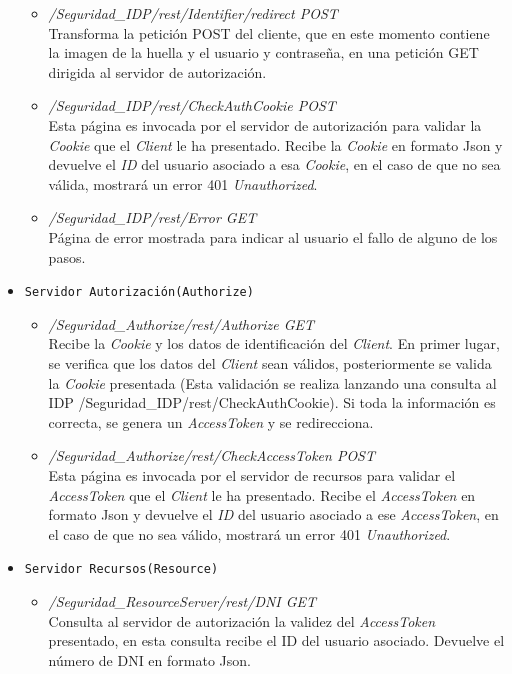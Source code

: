 \documentclass[a4,12pt,onecolum]{article}
\begin{document}
\begin{itemize}
\begin{itemize}
		\item \emph{/Seguridad\_IDP/rest/Identifier/redirect	POST} \\
		Transforma la petición POST del cliente, que en este momento contiene la imagen de la huella y el 				usuario y contraseña, en una petición GET dirigida al servidor de autorización.

		\item \emph{/Seguridad\_IDP/rest/CheckAuthCookie	POST} \\
		Esta página es invocada por el servidor de autorización para validar la \emph{Cookie} que el 					\emph{Client} le ha presentado. Recibe la \emph{Cookie} en formato Json y devuelve el \emph{ID} del 			usuario asociado a esa \emph{Cookie}, en el caso de que no sea válida, mostrará un error 401 					\emph{Unauthorized}.

		\item \emph{/Seguridad\_IDP/rest/Error	GET} \\
		Página de error mostrada para indicar al usuario el fallo de alguno de los pasos.
	\end{itemize}

\item \texttt{Servidor Autorización(Authorize)}
	\begin{itemize}
		\item \emph{/Seguridad\_Authorize/rest/Authorize	GET} \\
		Recibe la \emph{Cookie} y los datos de identificación del \emph{Client}. En primer lugar, se verifica 			que los datos del \emph{Client} sean válidos, posteriormente se valida la \emph{Cookie} presentada 				(Esta validación se realiza lanzando una consulta al IDP {/Seguridad\_IDP/rest/CheckAuthCookie}). 				Si toda la información es correcta, se genera un \emph{AccessToken} y se redirecciona.

		\item \emph{/Seguridad\_Authorize/rest/CheckAccessToken	POST} \\
		Esta página es invocada por el servidor de recursos para validar el \emph{AccessToken} que el 					\emph{Client} le ha presentado. Recibe el \emph{AccessToken} en formato Json y devuelve el \emph{ID} 			del	usuario asociado a ese \emph{AccessToken}, en el caso de que no sea válido, mostrará un error 401 			\emph{Unauthorized}.
	\end{itemize}

\item \texttt{Servidor Recursos(Resource)}
	\begin{itemize}
		\item \emph{/Seguridad\_ResourceServer/rest/DNI	GET} \\
		Consulta al servidor de autorización la validez del \emph{AccessToken} presentado, en esta consulta 			recibe el ID del usuario asociado. Devuelve el número de DNI en formato Json.


\end{itemize}
\end{itemize}
\end{document}
